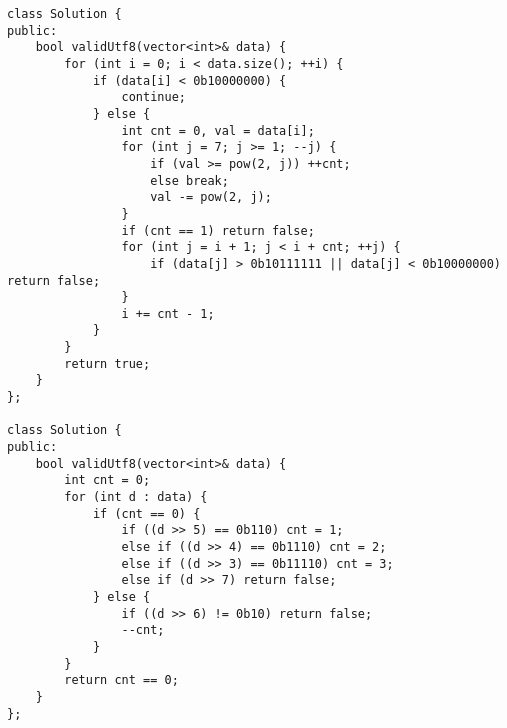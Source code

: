 \begin{lstlisting}
class Solution {
public:
    bool validUtf8(vector<int>& data) {
        for (int i = 0; i < data.size(); ++i) {
            if (data[i] < 0b10000000) {
                continue;
            } else {
                int cnt = 0, val = data[i];
                for (int j = 7; j >= 1; --j) {
                    if (val >= pow(2, j)) ++cnt;
                    else break;
                    val -= pow(2, j);
                }
                if (cnt == 1) return false;
                for (int j = i + 1; j < i + cnt; ++j) {
                    if (data[j] > 0b10111111 || data[j] < 0b10000000) return false;
                } 
                i += cnt - 1;
            }
        }
        return true;
    }
};

class Solution {
public:
    bool validUtf8(vector<int>& data) {
        int cnt = 0;
        for (int d : data) {
            if (cnt == 0) {
                if ((d >> 5) == 0b110) cnt = 1;
                else if ((d >> 4) == 0b1110) cnt = 2;
                else if ((d >> 3) == 0b11110) cnt = 3;
                else if (d >> 7) return false;
            } else {
                if ((d >> 6) != 0b10) return false;
                --cnt;
            }
        }
        return cnt == 0;
    }
};
\end{lstlisting}

